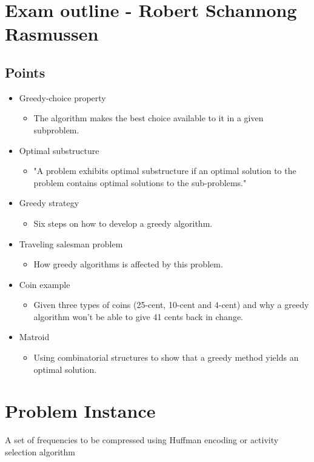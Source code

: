 \documentclass[12pt]{article}
\begin{document}
\section*{Exam outline - Robert Schannong Rasmussen}
\subsection*{Points}
\begin{itemize}
\item Greedy-choice property
	\begin{itemize}
	\item The algorithm makes the best choice available to it in a given subproblem.
	\end{itemize}
\item Optimal substructure
	\begin{itemize}
	\item "A problem exhibits optimal substructure if an optimal solution to the problem contains optimal solutions to the sub-problems."
	\end{itemize}
\item Greedy strategy
	\begin{itemize}
	\item Six steps on how to develop a greedy algorithm.
	\end{itemize}
\item Traveling salesman problem
	\begin{itemize}
	\item How greedy algorithms is affected by this problem.
	\end{itemize}
\item Coin example
	\begin{itemize}
	\item Given three types of coins (25-cent, 10-cent and 4-cent) and why a greedy algorithm won't be able to give 41 cents back in change.
	\end{itemize}
\item Matroid
	\begin{itemize}
	\item Using combinatorial structures to show that a greedy method yields an optimal solution.
	\end{itemize}
\end{itemize}

\section{Problem Instance}
A set of frequencies to be compressed using Huffman encoding
or activity selection algorithm
\end{document}

